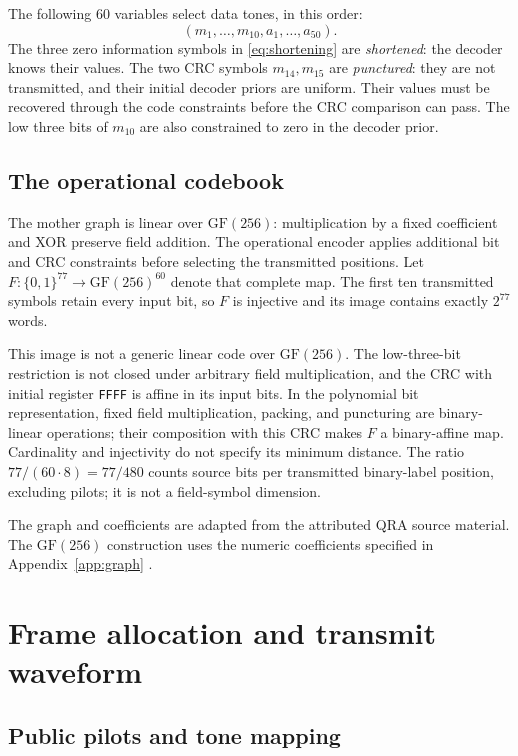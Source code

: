 \documentclass[11pt,a4paper]{article}
\newcommand{\GF}{\mathrm{GF}}
\begin{document}
The following 60 variables select data tones, in this order:
\begin{equation}
  (m_1,\ldots,m_{10},a_1,\ldots,a_{50}).
  \label{eq:transmitted}
\end{equation}
The three zero information symbols in \eqref{eq:shortening} are
\emph{shortened}: the decoder knows their values. The two CRC symbols
$m_{14},m_{15}$ are \emph{punctured}: they are not transmitted, and their
initial decoder priors are uniform. Their values must be recovered through
the code constraints before the CRC comparison can pass. The low three
bits of $m_{10}$ are also constrained to zero in the decoder prior.

\subsection{The operational codebook}

The mother graph is linear over $\GF(256)$: multiplication by a fixed
coefficient and XOR preserve field addition. The operational encoder applies
additional bit and CRC constraints before selecting the transmitted positions.
Let $F:\{0,1\}^{77}\rightarrow\GF(256)^{60}$ denote that complete map.
The first ten transmitted symbols retain every input bit, so $F$ is injective
and its image contains exactly $2^{77}$ words.

This image is not a generic linear code over $\GF(256)$. The low-three-bit
restriction is not closed under arbitrary field multiplication, and the
CRC with initial register \texttt{FFFF} is affine in its input bits. In the
polynomial bit representation, fixed field multiplication, packing, and
puncturing are binary-linear operations; their composition with this CRC
makes $F$ a binary-affine map. Cardinality and injectivity do not specify
its minimum distance. The ratio $77/(60\cdot8)=77/480$ counts source bits
per transmitted binary-label position, excluding pilots; it is not a
field-symbol dimension.

The graph and coefficients are adapted from the attributed QRA source
material. The $\GF(256)$ construction uses the numeric coefficients
specified in Appendix~\ref{app:graph} \cite{coding,provenance}.

\section{Frame allocation and transmit waveform}
\label{sec:tx}

\subsection{Public pilots and tone mapping}
\end{document}
